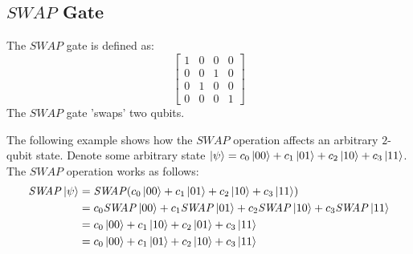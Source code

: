 \subsection{\texorpdfstring{$\mathit{SWAP}$}{} Gate}
\label{subsubsection:SWAP}
The $\mathit{SWAP}$ gate is defined as:
$$\begin{bmatrix} 1 & 0 & 0 & 0 \\ 0 & 0 & 1 & 0 \\ 0 & 1 & 0 & 0 \\ 0 & 0 & 0 & 1\end{bmatrix}$$
The $\mathit{SWAP}$ gate 'swaps' two qubits.
\begin{example}
The following example shows how the $\mathit{SWAP}$ operation affects an arbitrary $2$-qubit state. Denote some arbitrary state $\ket{\psi} = c_0\ket{00} + c_1\ket{01} + c_2\ket{10} + c_3\ket{11}$. The $\mathit{SWAP}$ operation works as follows:
\begin{align}
\mathit{SWAP}\ket{\psi} &= \mathit{SWAP}(c_0\ket{00} + c_1\ket{01} + c_2\ket{10} + c_3\ket{11})\\
&= c_0\mathit{SWAP}\ket{00} + c_1\mathit{SWAP}\ket{01} + c_2\mathit{SWAP}\ket{10} + c_3\mathit{SWAP}\ket{11}\\
&= c_0\ket{00} + c_1\ket{10} + c_2\ket{01} + c_3\ket{11}\\
&= c_0\ket{00} + c_1\ket{01} + c_2\ket{10} + c_3\ket{11}
\end{align}
\end{example}

